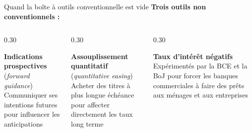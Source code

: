 \documentclass[aspectratio=169]{beamer}
\begin{document}
\begin{frame}[t]{Quand la boîte à outils conventionnelle est vide}
   \vspace{0.3cm}
   \textbf{Trois outils non conventionnels :}
   \vspace{0.3cm}
   \begin{columns}[T,onlytextwidth]
      \begin{column}{0.30\textwidth}
         \begin{tcolorbox}[colback=HECgreen!8, colframe=HECgreen, boxrule=0.5pt, arc=8pt,
            top=4pt, bottom=4pt, left=6pt, right=6pt,
            equal height group=toolbox]
            \centering\footnotesize\textbf{Indications prospectives}\\(\textit{forward guidance})\\[3pt]
            Communiquer ses intentions futures pour influencer les anticipations
         \end{tcolorbox}
      \end{column}
      \begin{column}{0.30\textwidth}
         \begin{tcolorbox}[colback=HECnavy!8, colframe=HECnavy, boxrule=0.5pt, arc=8pt,
            top=4pt, bottom=4pt, left=6pt, right=6pt,
            equal height group=toolbox]
            \centering\footnotesize\textbf{Assouplissement quantitatif}\\(\textit{quantitative easing})\\[3pt]
            Acheter des titres à plus longue échéance pour affecter directement les taux long terme
         \end{tcolorbox}
      \end{column}
      \begin{column}{0.30\textwidth}
         \begin{tcolorbox}[colback=HECcoral!8, colframe=HECcoral, boxrule=0.5pt, arc=8pt,
            top=4pt, bottom=4pt, left=6pt, right=6pt,
            equal height group=toolbox]
            \centering\footnotesize\textbf{Taux d'intérêt négatifs}\\[3pt]
            Expérimentés par la BCE et la BoJ pour forcer les banques commerciales à faire des prêts aux ménages et aux entreprises
         \end{tcolorbox}
      \end{column}
   \end{columns}
\end{frame}
\end{document}
